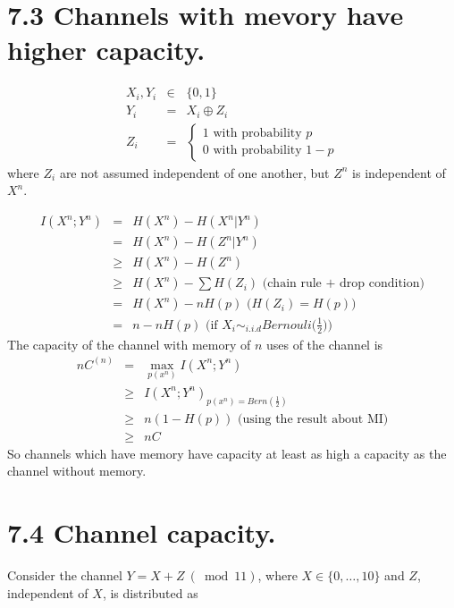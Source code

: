\documentclass[12pt]{article}
\newcommand{\setbrace}[1]{{\{#1\}}}
\begin{document}
\begin{tiny}
\begin{multicols}{2}
\section*{7.3 Channels with mevory have higher capacity.}
\begin{eqnarray*}
    X_i, Y_i &\in& \{0,1\} \\
    Y_i &=& X_i \oplus Z_i \\
    Z_i &=& \begin{cases}
        1 \text{ with probability } p \\
        0 \text{ with probability } 1 - p
    \end{cases}
\end{eqnarray*}
where $Z_i$ are not assumed independent of one another, but $Z^n$ is independent of $X^n$.

\begin{eqnarray*}
    I(X^n;Y^n) &=& H(X^n) - H(X^n|Y^n) \\
    &=& H(X^n) - H(Z^n|Y^n) \\
    &\ge& H(X^n) - H(Z^n) \\
    &\ge& H(X^n) - \sum H(Z_i) \text{ (chain rule + drop condition)}\\
    &=& H(X^n) - nH(p) \text{ ($H(Z_i) = H(p)$)} \\
    &=& n - nH(p) \text{ (if $X_i \sim_{i.i.d} Bernouli\big(\frac{1}{2}\big)$)}
\end{eqnarray*}
The capacity of the channel with memory of $n$ uses of the channel is
\begin{eqnarray*}
    nC^{(n)} &=& \max_{p(x^n)} I(X^n; Y^n) \\
    &\ge& I(X^n;Y^n)_{p(x^n)=Bern(\frac{1}{2})} \\
    &\ge& n ( 1 - H(p)) \text{ (using the result about MI)} \\
    &\ge& nC
\end{eqnarray*}
So channels which have memory have capacity at least as high a capacity as the channel without memory.

\section*{7.4 Channel capacity.}

Consider the channel $Y=X+Z\ (\bmod 11)$, where $X \in
\setbrace{0,\dots,10}$ and $Z$, independent of $X$, is distributed as


\end{multicols}
\end{tiny}
\end{document}
